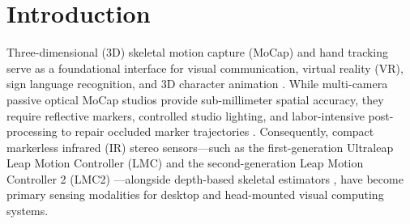 \documentclass[10pt,twocolumn]{article}
\begin{document}
\section{Introduction}
Three-dimensional (3D) skeletal motion capture (MoCap) and hand tracking serve as a foundational interface for visual communication, virtual reality (VR), sign language recognition, and 3D character animation \cite{bregler2007motion,tirakoat2011optimized,noiumkar2013use,marin2016hand,chen2020construct}. While multi-camera passive optical MoCap studios provide sub-millimeter spatial accuracy, they require reflective markers, controlled studio lighting, and labor-intensive post-processing to repair occluded marker trajectories \cite{tirakoat2011optimized,noiumkar2013use}. Consequently, compact markerless infrared (IR) stereo sensors---such as the first-generation Ultraleap Leap Motion Controller (LMC) \cite{marin2016hand,boulahia2017dynamic} and the second-generation Leap Motion Controller 2 (LMC2) \cite{gilmartin2024dual,matuszczyk2025comparative}---alongside depth-based skeletal estimators \cite{desmedt2017shrec,chen2018nonparametric,kumar2018position}, have become primary sensing modalities for desktop and head-mounted visual computing systems.
\end{document}
